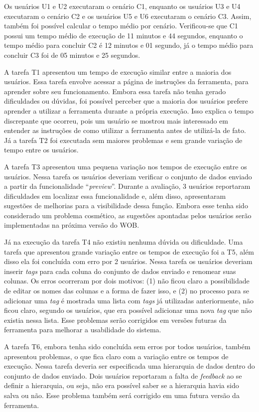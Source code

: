 Os usuários U1 e U2 executaram o cenário C1, enquanto os usuários U3 e U4 executaram o 
cenário C2 e os usuários U5 e U6 executaram o cenário C3. Assim, também foi possível calcular
o tempo médio por cenário. Verificou-se que C1 possui um tempo médio de execução de 11 
minutos e 44 segundos, enquanto o tempo médio para concluir C2 é 12 minutos e 01 segundo, 
já o tempo médio para concluir C3 foi de 05 minutos e 25 segundos.

A tarefa T1 apresentou um tempo de execução similar entre a maioria dos usuários. Essa tarefa 
envolve acessar a página de instruções da ferramenta, para aprender sobre seu funcionamento. 
Embora essa tarefa não tenha gerado dificuldades ou dúvidas, foi possível perceber que a 
maioria dos usuários prefere aprender a utilizar a ferramenta durante a própria execução. 
Isso explica o tempo discrepante que ocorreu, pois um usuário se mostrou mais interessado 
em entender as instruções de como utilizar a ferramenta antes de utilizá-la de fato. Já a 
tarefa T2 foi executada sem maiores problemas e sem grande variação de tempo entre os 
usuários.

A tarefa T3 apresentou uma pequena variação nos tempos de execução entre os usuários. 
Nessa tarefa os usuários deveriam verificar o conjunto de dados enviado a partir da 
funcionalidade “\textit{preview}”. Durante a avaliação, 3 usuários reportaram dificuldades em 
localizar essa funcionalidade e, além disso, apresentaram sugestões de melhorias para 
a visibilidade dessa função. Embora esse tenha sido considerado um problema cosmético, 
as sugestões apontadas pelos usuários serão implementadas na próxima versão do WOB.

Já na execução da tarefa T4 não existiu nenhuma dúvida ou dificuldade. Uma tarefa que 
apresentou grande variação entre os tempos de execução foi a T5, além disso ela foi 
concluída com erro por 2 usuários. Nessa tarefa os usuários deveriam inserir \textit{tags} para 
cada coluna do conjunto de dados enviado e renomear suas colunas. Os erros ocorreram por 
dois motivos: (1) não ficou claro a possibilidade de editar os nomes das colunas e a 
forma de fazer isso, e (2) no processo para se adicionar uma \textit{tag} é mostrada uma lista 
com \textit{tags} já utilizadas anteriormente, não ficou claro, segundo os usuários, que era 
possível adicionar uma nova \textit{tag} que não existia nessa lista. Esse problemas serão 
corrigidos em versões futuras da ferramenta para melhorar a usabilidade do sistema.

A tarefa T6, embora tenha sido concluída sem erros por todos usuários, também apresentou 
problemas, o que fica claro com a variação entre os tempos de execução. Nessa tarefa 
deveria ser especificada uma hierarquia de dados dentro do conjunto de dados enviado. 
Dois usuários reportaram a falta de \textit{feedback} ao se definir a hierarquia, ou seja, não era 
possível saber se a hierarquia havia sido salva ou não. Esse problema também será corrigido 
em uma futura versão da ferramenta.

